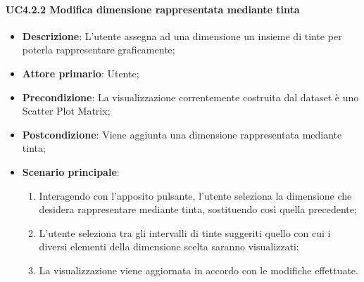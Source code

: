 \paragraph{UC4.2.2 Modifica dimensione rappresentata mediante tinta}
\label{par:uc4.2.2}
\begin{itemize}
    
    \item \textbf{Descrizione}:     L'utente assegna ad una dimensione un insieme di tinte per poterla rappresentare 
                                    graficamente;
    
    \item \textbf{Attore primario}: Utente;
    \item \textbf{Precondizione}:   La visualizzazione correntemente costruita dal dataset è uno Scatter Plot Matrix;
    \item \textbf{Postcondizione}:  Viene aggiunta una dimensione rappresentata mediante tinta;
    \item \textbf{Scenario principale}:
    \begin{enumerate}
        
        \item   Interagendo con l'apposito pulsante, l'utente seleziona la dimensione che desidera rappresentare 
                mediante tinta, sostituendo così quella precedente;

        \item   L'utente seleziona tra gli intervalli di tinte suggeriti quello con cui i diversi elementi della 
                dimensione scelta saranno visualizzati;
        
        \item   La visualizzazione viene aggiornata in accordo con le modifiche effettuate.
    \end{enumerate}
\end{itemize}

